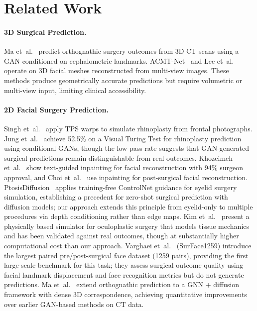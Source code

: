 \documentclass[twocolumn]{article}
\begin{document}
\section{Related Work}
\label{sec:related}

\paragraph{3D Surgical Prediction.}
Ma et~al.~\cite{ma2023gposc} predict orthognathic surgery outcomes
from 3D CT scans using a GAN conditioned on cephalometric landmarks.
ACMT-Net~\cite{li2023acmt} and Lee et~al.~\cite{lee2022prediction}
operate on 3D facial meshes reconstructed from multi-view images.
These methods produce geometrically accurate predictions but require
volumetric or multi-view input, limiting clinical accessibility.

\paragraph{2D Facial Surgery Prediction.}
Singh et~al.~\cite{singh2022rhinoplasty} apply TPS warps to simulate
rhinoplasty from frontal photographs.
Jung et~al.~\cite{jung2024rhinoplastygan} achieve 52.5\% on a Visual
Turing Test for rhinoplasty prediction using conditional GANs, though
the low pass rate suggests that GAN-generated surgical predictions remain
distinguishable from real outcomes.
Khozeimeh et~al.~\cite{khozeimeh2025medicina} show text-guided
inpainting for facial reconstruction with 94\% surgeon approval, and
Choi et~al.~\cite{choi2025mdpi} use inpainting for post-surgical facial
reconstruction.
PtosisDiffusion~\cite{ptosisdiffusion2024} applies training-free ControlNet
guidance for eyelid surgery simulation, establishing a precedent for
zero-shot surgical prediction with diffusion models; our approach extends
this principle from eyelid-only to multiple procedures via depth
conditioning rather than edge maps.
Kim et~al.~\cite{kim2025oculoplastic} present a physically based simulator
for oculoplastic surgery that models tissue mechanics and has been validated
against real outcomes, though at substantially higher computational cost
than our approach.
Varghaei et~al.~\cite{varghaei2025surface1259} (SurFace1259) introduce the
largest paired pre/post-surgical face dataset (1259 pairs), providing the
first large-scale benchmark for this task; they assess surgical outcome
quality using facial landmark displacement and face recognition metrics
but do not generate predictions.
Ma et~al.~\cite{ma2025gposc} extend orthognathic prediction to a GNN +
diffusion framework with dense 3D correspondence, achieving quantitative
improvements over earlier GAN-based methods on CT data.
\end{document}

